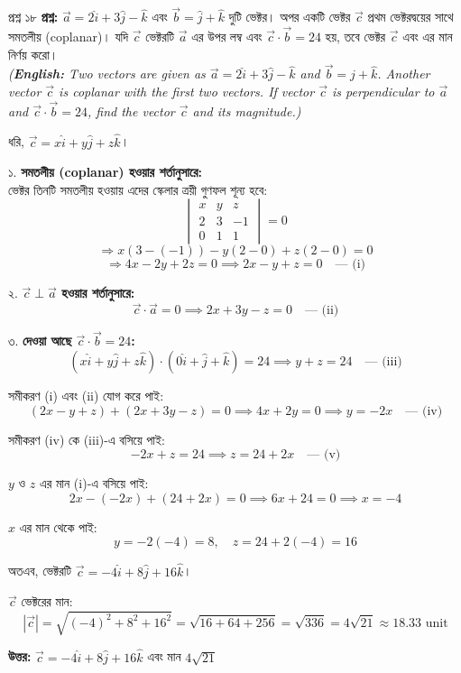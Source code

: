 \documentclass[11pt,a4paper]{article}
\begin{document}
\vspace{0.4cm}

\begin{qbox}{প্রশ্ন ১৮}
\textbf{প্রশ্ন:} $\vec{a} = 2\hat{i} + 3\hat{j} - \hat{k}$ এবং $\vec{b} = \hat{j} + \hat{k}$ দুটি ভেক্টর। অপর একটি ভেক্টর $\vec{c}$ প্রথম ভেক্টরদ্বয়ের সাথে সমতলীয় (coplanar)। যদি $\vec{c}$ ভেক্টরটি $\vec{a}$ এর উপর লম্ব এবং $\vec{c} \cdot \vec{b} = 24$ হয়, তবে ভেক্টর $\vec{c}$ এবং এর মান নির্ণয় করো। \\
\textit{(\textbf{English:} Two vectors are given as $\vec{a} = 2\hat{i} + 3\hat{j} - \hat{k}$ and $\vec{b} = \hat{j} + \hat{k}$. Another vector $\vec{c}$ is coplanar with the first two vectors. If vector $\vec{c}$ is perpendicular to $\vec{a}$ and $\vec{c} \cdot \vec{b} = 24$, find the vector $\vec{c}$ and its magnitude.)}
\end{qbox}

\begin{solbox}
ধরি, $\vec{c} = x\hat{i} + y\hat{j} + z\hat{k}$।

১. \textbf{সমতলীয় (coplanar) হওয়ার শর্তানুসারে:} \\
ভেক্টর তিনটি সমতলীয় হওয়ায় এদের স্কেলার ত্রয়ী গুণফল শূন্য হবে:
$$\begin{vmatrix} x & y & z \\ 2 & 3 & -1 \\ 0 & 1 & 1 \end{vmatrix} = 0$$
$$\Rightarrow x(3 - (-1)) - y(2 - 0) + z(2 - 0) = 0$$
$$\Rightarrow 4x - 2y + 2z = 0 \implies 2x - y + z = 0 \quad \text{--- (i)}$$

২. \textbf{$\vec{c} \perp \vec{a}$ হওয়ার শর্তানুসারে:}
$$\vec{c} \cdot \vec{a} = 0 \implies 2x + 3y - z = 0 \quad \text{--- (ii)}$$

৩. \textbf{দেওয়া আছে $\vec{c} \cdot \vec{b} = 24$:}
$$(x\hat{i} + y\hat{j} + z\hat{k}) \cdot (0\hat{i} + \hat{j} + \hat{k}) = 24 \implies y + z = 24 \quad \text{--- (iii)}$$

সমীকরণ (i) এবং (ii) যোগ করে পাই:
$$(2x - y + z) + (2x + 3y - z) = 0 \implies 4x + 2y = 0 \implies y = -2x \quad \text{--- (iv)}$$

সমীকরণ (iv) কে (iii)-এ বসিয়ে পাই:
$$-2x + z = 24 \implies z = 24 + 2x \quad \text{--- (v)}$$

$y$ ও $z$ এর মান (i)-এ বসিয়ে পাই:
$$2x - (-2x) + (24 + 2x) = 0 \implies 6x + 24 = 0 \implies x = -4$$

$x$ এর মান থেকে পাই:
$$y = -2(-4) = 8, \quad z = 24 + 2(-4) = 16$$

অতএব, ভেক্টরটি $\vec{c} = -4\hat{i} + 8\hat{j} + 16\hat{k}$।

$\vec{c}$ ভেক্টরের মান:
$$|\vec{c}| = \sqrt{(-4)^2 + 8^2 + 16^2} = \sqrt{16 + 64 + 256} = \sqrt{336} = 4\sqrt{21} \approx 18.33\text{ unit}$$

\textbf{উত্তর:} $\vec{c} = -4\hat{i} + 8\hat{j} + 16\hat{k}$ এবং মান $4\sqrt{21}$
\end{solbox}
\end{document}
